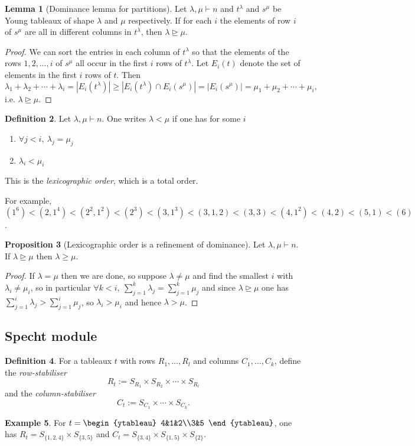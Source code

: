 \documentclass[a4paper]{article}
\theoremstyle{definition}
\newtheorem{defn}{Definition}[subsection]
\newtheorem{prop}[defn]{Proposition}
\newtheorem{lemma}[defn]{Lemma}
\newtheorem{example}[defn]{Example}
\begin{document}
\begin{lemma}[Dominance lemma for partitions]
\label{lemma:dompart}
Let $\lambda,\mu\vdash n$ and $t^\lambda$ and $s^\mu$ be Young tableaux of shape $\lambda$ and $\mu$ respectively. If for each $i$ the elements of row $i$ of $s^\mu$ are all in different columns in $t^\lambda$, then $\lambda\unrhd\mu$.
\end{lemma}
\begin{proof}
We can sort the entries in each column of $t^\lambda$ so that the elements of the rows $1,2,\ldots,i$ of $s^\mu$ all occur in the first $i$ rows of $t^\lambda$. Let $E_i(t)$ denote the set of elements in the first $i$ rows of $t$. Then
\[
\lambda_1+\lambda_2+\cdots+\lambda_i=|E_i(t^\lambda)|\geq |E_i(t^\lambda)\cap E_i(s^\mu)|=|E_i(s^\mu)|=\mu_1+\mu_2+\cdots+\mu_i,
\]
i.e. $\lambda\unrhd\mu$.
\end{proof}

\begin{defn}
Let $\lambda,\mu\vdash n$. One writes $\lambda<\mu$ if one has for some $i$
\begin{enumerate}
\item $\forall j<i,\ \lambda_j=\mu_j$
\item $\lambda_i<\mu_i$
\end{enumerate}
This is the \textit{lexicographic order}, which is a total order.

For example, $(1^6)<(2,1^4)<(2^2,1^2)<(2^3)<(3,1^3)<(3,1,2)<(3,3)<(4,1^2)<(4,2)<(5,1)<(6)$.
\end{defn}

\begin{prop}[Lexicographic order is a refinement of dominance]
Let $\lambda,\mu\vdash n$. If $\lambda\unrhd\mu$ then $\lambda\geq\mu$.
\end{prop}
\begin{proof}
If $\lambda=\mu$ then we are done, so suppose $\lambda\neq\mu$ and find the smallest $i$ with $\lambda_i\neq\mu_i$, so in particular $\forall k<i,\ \sum_{j=1}^k \lambda_j=\sum_{j=1}^k\mu_j$ and since $\lambda\unrhd\mu$ one has $\sum_{j=1}^i \lambda_j>\sum_{j=1}^i\mu_j$, so $\lambda_i>\mu_i$ and hence $\lambda>\mu$.
\end{proof}

\subsection{Specht module}
\begin{defn}
For a tableaux $t$ with rows $R_1,\ldots,R_l$ and columns $C_1,\ldots,C_k$, define the \textit{row-stabiliser}
\[
R_t:=S_{R_1}\times S_{R_2}\times\cdots\times S_{R_l}
\]
and the \textit{column-stabiliser}
\[
C_t:=S_{C_1}\times\cdots\times S_{C_k}.
\]
\end{defn}
\begin{example}
For $t=\begin{ytableau}
4&1&2\\3&5
\end{ytableau}$, one has $R_t=S_{\{1,2,4\}}\times S_{\{3,5\}}$ and $C_t=S_{\{3,4\}}\times S_{\{1,5\}}\times S_{\{2\}}$.
\end{example}
\end{document}
